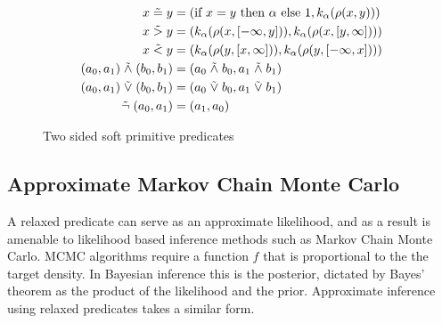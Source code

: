

\begin{figure}\label{softw}
\begin{align*}
x \mathrel{\tilde{=}} y &= (\text{if } x = y  \text{ then } \alpha \text{ else } 1, k_\alpha(\rho(x, y)))\\
x \mathrel{\tilde{>}} y &= (k_\alpha(\rho(x, [-\infty, y])), k_\alpha(\rho(x, [y, \infty])))\\
x \mathrel{\tilde{<}} y &= (k_\alpha(\rho(y, [x, \infty])), k_\alpha(\rho(y, [-\infty, x])))\\
(a_0, a_1) \mathrel{\tilde{\land}} (b_0, b_1) &= (a_0 \mathrel{\tilde{\land}} b_0, a_1 \mathrel{\tilde{\land}} b_1)\\
(a_0, a_1) \mathrel{\tilde{\lor}} (b_0, b_1) &= (a_0 \mathrel{\tilde{\lor}} b_0, a_1 \mathrel{\tilde{\lor}} b_1)\\
\mathrel{\tilde{\neg}}(a_0, a_1) &= (a_1, a_0)
\end{align*}
\caption{Two sided soft primitive predicates}
\end{figure}




\subsection{Approximate Markov Chain Monte Carlo}
A relaxed predicate can serve as an approximate likelihood, and as a result is amenable to likelihood based inference methods such as Markov Chain Monte Carlo.
MCMC algorithms require a function $f$ that is proportional to the the target density.
In Bayesian inference this is the posterior, dictated by Bayes' theorem as the product of the likelihood and the prior.
Approximate inference using relaxed predicates takes a similar form.

